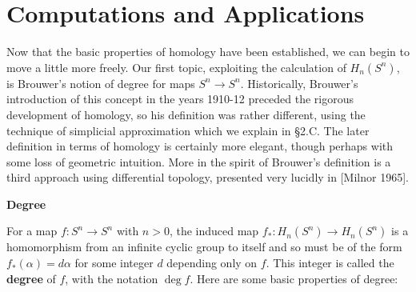\section{Computations and Applications}

Now that the basic properties of homology have been established, we can begin to move a little more freely. Our first topic, exploiting the calculation of $H_n(S^n)$, is Brouwer's notion of degree for maps $S^n \to S^n$. Historically, Brouwer's introduction of this concept in the years 1910-12 preceded the rigorous development of homology, so his definition was rather different, using the technique of simplicial approximation which we explain in \S 2.C. The later definition in terms of homology is certainly more elegant, though perhaps with some loss of geometric intuition. More in the spirit of Brouwer's definition is a third approach using differential topology, presented very lucidly in [Milnor 1965].

\textbf{Degree}

For a map $f : S^n \to S^n$ with $n > 0$, the induced map $f_* : H_n(S^n) \to H_n(S^n)$ is a homomorphism from an infinite cyclic group to itself and so must be of the form $f_*(\alpha) = d\alpha$ for some integer $d$ depending only on $f$. This integer is called the \textbf{degree} of $f$, with the notation $\deg f$. Here are some basic properties of degree:

